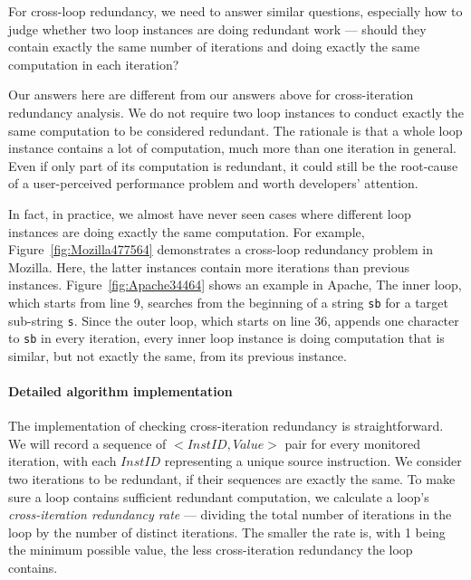 For cross-loop redundancy, we need to answer similar questions,
especially how to judge whether two loop instances are doing redundant work ---
should they contain exactly the same number of iterations and doing exactly
the same computation in each iteration?

Our answers here are different from our answers above for cross-iteration
redundancy analysis.
We do not require two loop instances to
conduct exactly the same computation to be considered redundant. The rationale
is that a whole loop instance contains a lot of computation, much more than
one iteration in general. Even if only part of its computation
is redundant, it could still be the root-cause of a user-perceived performance
problem and worth developers' attention. 

In fact, in practice, we almost have never seen cases where different loop 
instances are doing exactly the same computation.
For example, Figure~\ref{fig:Mozilla477564} demonstrates a cross-loop redundancy
problem in Mozilla. Here, the
latter instances contain more iterations than previous instances. 
Figure~\ref{fig:Apache34464} shows an example in Apache, 
The inner loop, which starts from line 9,  
searches from the beginning of a string \texttt{sb} for a target sub-string 
\texttt{s}. Since the outer loop, which starts on line 36, appends one 
character to \texttt{sb} in every iteration, every inner loop instance is 
doing computation that is similar, but not exactly the same, 
from its previous instance.


\paragraph{Detailed algorithm implementation}

The implementation of checking cross-iteration redundancy is straightforward.
We will record a sequence of $<InstID, Value>$ pair for every monitored
iteration, with each $InstID$ representing a unique source instruction.
We consider two iterations to be redundant, if their sequences are exactly the
same. To make sure a loop contains sufficient redundant computation, 
we calculate a loop's \textit{cross-iteration redundancy rate} --- dividing 
the total number of iterations in the loop by the number of distinct iterations.
The smaller the rate is, with 1 being the minimum possible value, 
the less cross-iteration redundancy the loop contains.

